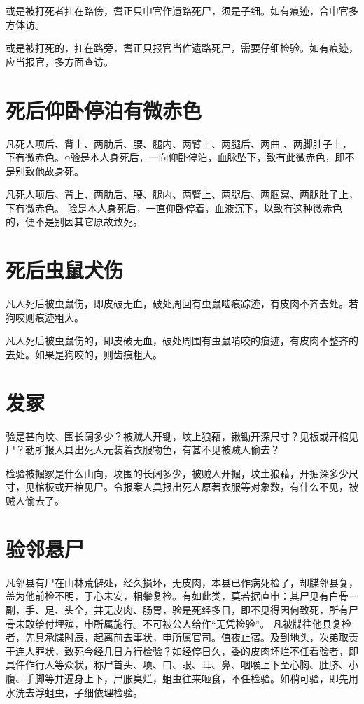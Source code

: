 \documentclass[12pt,UTF8]{ctexbook}
\begin{document}
或是被打死者扛在路傍，耆正只申官作遗路死尸，须是子细。如有痕迹，合申官多方体访。


或是被打死的，扛在路旁，耆正只报官当作遗路死尸，需要仔细检验。如有痕迹，应当报官，多方面查访。


\chapter{死后仰卧停泊有微赤色}

凡死人项后、背上、两肋后、腰、腿内、两臂上、两腿后、两曲 、两脚肚子上，下有微赤色。○验是本人身死后，一向仰卧停泊，血脉坠下，致有此微赤色，即不是别致他故身死。


凡死人项后、背上、两肋后、腰、腿内、两臂上、两腿后、两腘窝、两腿肚子上，下有微赤色。
验是本人身死后，一直仰卧停着，血液沉下，以致有这种微赤色的，便不是别因其它原故致死。


\chapter{死后虫鼠犬伤}
凡人死后被虫鼠伤，即皮破无血，破处周回有虫鼠啮痕踪迹，有皮肉不齐去处。若狗咬则痕迹粗大。


凡人死后被虫鼠伤的，即皮破无血，破处周围有虫鼠啃咬的痕迹，有皮肉不整齐的去处。如果是狗咬的，则齿痕粗大。


\chapter{发冢}
验是甚向坟、围长阔多少？被贼人开锄，坟上狼藉，锹锄开深尺寸？见板或开棺见尸？勒所报人具出死人元装着衣服物色，有甚不见被贼人偷去？


检验被掘冢是什么山向，坟围的长阔多少，被贼人开掘，坟土狼藉，开掘深多少尺寸，见棺板或开棺见尸。令报案人具报出死人原著衣服等对象数，有什么不见，被贼人偷去了。


\chapter{验邻悬尸}
凡邻县有尸在山林荒僻处，经久损坏，无皮肉，本县已作病死检了，却牒邻县复，盖为他前检不明，于心未安，相攀复检。有如此类，莫若据直申：其尸见有白骨一副，手、足、头全，并无皮肉、肠胃，验是死经多日，即不见得因何致死，所有尸骨未敢给付埋殡，申所属施行。不可被公人给作“无凭检验”。
凡被牒往他县复检者，先具承牒时辰，起离前去事状，申所属官司。值夜止宿。及到地头，次弟取责于连人罪状，致死今经几日方行检验？如经停日久，委的皮肉坏烂不任看验者，即具仵作行人等众状，称尸首头、项、口、眼、耳、鼻、咽喉上下至心胸、肚脐、小腹、手脚等并遍身上下，尸胀臭烂，蛆虫往来咂食，不任检验。如稍可验，即先用水洗去浮蛆虫，子细依理检验。
\end{document}
